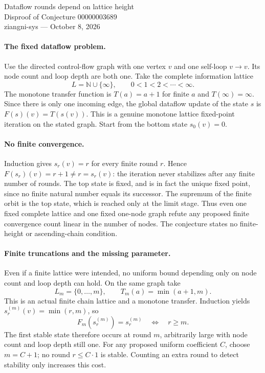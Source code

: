 \documentclass[11pt]{article}
\begin{document}
\begin{center}
{\Large Dataflow rounds depend on lattice height}\\[4pt]
Disproof of Conjecture 00000003689\\[4pt]
ziangni-sys --- October 8, 2026
\end{center}
\paragraph{The fixed dataflow problem.}
Use the directed control-flow graph with one vertex $v$ and one
self-loop $v\to v$. Its node count and loop depth are both one.
Take the complete information lattice
\[
 L=\mathbb N\cup\{\infty\},\qquad 0<1<2<\cdots<\infty.
\]
The monotone transfer function is $T(a)=a+1$ for finite $a$ and
$T(\infty)=\infty$. Since there is only one incoming edge, the
global dataflow update of the state $s$ is $F(s)(v)=T(s(v))$.
This is a genuine monotone lattice fixed-point iteration on the
stated graph. Start from the bottom state $s_0(v)=0$.

\paragraph{No finite convergence.}
Induction gives $s_r(v)=r$ for every finite round $r$. Hence
$F(s_r)(v)=r+1\ne r=s_r(v)$: the iteration never stabilizes after
any finite number of rounds. The top state is fixed, and is in
fact the unique fixed point, since no finite natural number equals
its successor. The supremum of the finite orbit is the top state,
which is reached only at the limit stage. Thus even one fixed
complete lattice and one fixed one-node graph refute any proposed
finite convergence count linear in the number of nodes.
The conjecture states no finite-height or ascending-chain condition.

\paragraph{Finite truncations and the missing parameter.}
Even if a finite lattice were intended, no uniform bound depending
only on node count and loop depth can hold. On the same graph take
\[
 L_m=\{0,\ldots,m\},\qquad T_m(a)=\min(a+1,m).
\]
This is an actual finite chain lattice and a monotone transfer.
Induction yields $s^{(m)}_r(v)=\min(r,m)$, so
\[
 F_m(s^{(m)}_r)=s^{(m)}_r\quad\Longleftrightarrow\quad r\geq m.
\]
The first stable state therefore occurs at round $m$, arbitrarily
large with node count and loop depth still one. For any proposed
uniform coefficient $C$, choose $m=C+1$; no round $r\leq C\cdot1$
is stable. Counting an extra round to detect stability only
increases this cost.
\end{document}
